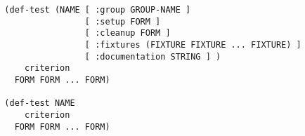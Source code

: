 \begin{verbatim}
  (def-test (NAME [ :group GROUP-NAME ]
                  [ :setup FORM ]
                  [ :cleanup FORM ]
                  [ :fixtures (FIXTURE FIXTURE ... FIXTURE) ]
                  [ :documentation STRING ] )
      criterion
    FORM FORM ... FORM)

  (def-test NAME
      criterion
    FORM FORM ... FORM)
\end{verbatim}
